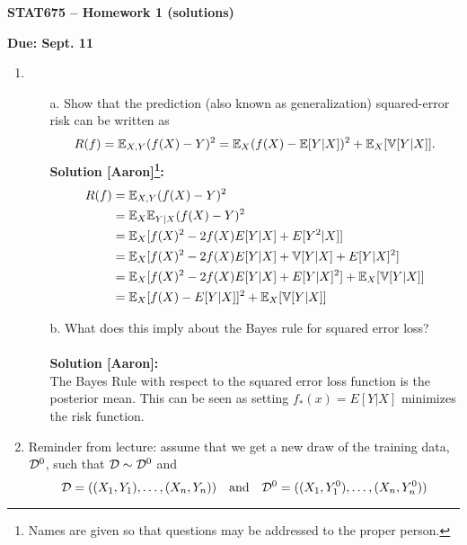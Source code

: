 \documentclass[11pt]{article}
\begin{document}
\baselineskip=13.2pt
\parindent=0pt
\parskip=13.2pt
\pagestyle{empty}

\newcommand{\sd}{\textrm{sd}}

\centerline{\bf \Large STAT675 -- Homework 1 (solutions)}
\centerline{\bf \large Due: Sept. 11}
\begin{enumerate}
\item
\begin{itemize}
\item[a.] Show that the prediction (also known as generalization) squared-error risk can be written as
\begin{equation}
R(f) = \mathbb{E}_{X,Y} (f(X) - Y)^2 = \mathbb{E}_X (f(X) - \mathbb{E}[Y|X])^2 + \mathbb{E}_X[\mathbb{V}[Y|X]].
\label{eq:bayes}
\end{equation}
\textbf{Solution [Aaron]\footnote{Names are given so that questions may be
    addressed to the proper person.}:} \\
\begin{equation*}
\begin{split}
R(f) & =  \mathbb{E}_{X,Y} (f(X) - Y)^2 \\
& = \mathbb{E}_{X}\mathbb{E}_{Y|X}(f(X)-Y)^2 \\
& = \mathbb{E}_{X}[f(X)^2 - 2f(X)E[Y|X] + E[Y^2|X]] \\
& = \mathbb{E}_{X}[f(X)^2 - 2f(X)E[Y|X] + \mathbb{V}[Y|X] + E[Y|X]^2] \\
& = \mathbb{E}_{X}[f(X)^2 - 2f(X)E[Y|X] + E[Y|X]^2] + \mathbb{E}_{X}[\mathbb{V}[Y|X]] \\
& = \mathbb{E}_{X}[f(X) - E[Y|X]]^2 + \mathbb{E}_{X}[\mathbb{V}[Y|X]]
\end{split}
\end{equation*}
\item[b.] What does this imply about the Bayes rule for squared error loss? \\
\\
\textbf{Solution [Aaron]:} \\
The Bayes Rule with respect to the squared error loss function is the posterior mean. This can be seen as setting \(f_*(x)=E[Y|X]\) minimizes the risk function.
\end{itemize}

  \newpage
\item Reminder from lecture: assume that we get a new draw of the training data,
  $\mathcal{D}^0$, such that $\mathcal{D} \sim \mathcal{D}^0$ and
  \[
  \mathcal{D} = ((X_1,Y_1), \ldots, (X_n,Y_n)) \quad \textrm{and} \quad \mathcal{D}^0 =
  ((X_1,Y_1^0), \ldots, (X_n,Y_n^0))
  \]



\end{enumerate}
\end{document}
